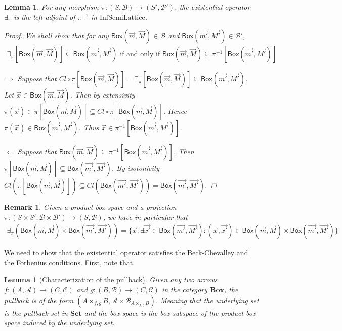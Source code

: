 \documentclass[12pt]{article}
\newtheorem{lemma}[theorem]{Lemma}
\newtheorem{remark}[theorem]{Remark}
\newcommand{\InfSemiLattice}{\text{InfSemiLattice}}
\newcommand{\bobject}{\mathsf{Box}}
\begin{document}
\begin{lemma}
    For any morphism $\pi:(S,\mathcal{B})\to(S',\mathcal{B}')$,
    the existential operator $\exists_\pi$ is the left adjoint of $\pi^{-1}$ in $\InfSemiLattice$.
    \begin{proof}
        We shall show that for any $\bobject(\vec{m},\vec{M})\in\mathcal{B}$ and $\bobject(\vec{m'},\vec{M'})\in\mathcal{B}'$,
        \begin{gather*}
            \exists_\pi[\bobject(\vec{m},\vec{M})]\subseteq \bobject(\vec{m'},\vec{M'})\text{ if and only if }
            \bobject(\vec{m},\vec{M})\subseteq \pi^{-1}[\bobject(\vec{m'},\vec{M'})]
        \end{gather*}
        \par $\Rightarrow$ Suppose that $Cl\circ \pi[\bobject(\vec{m},\vec{M})]=\exists_\pi[\bobject(\vec{m},\vec{M})]\subseteq \bobject(\vec{m'},\vec{M'})$.
        Let $\vec{x}\in\bobject(\vec{m},\vec{M})$.
        Then by extensivity $\pi(\vec{x})\in\pi[\bobject(\vec{m},\vec{M})]\subseteq Cl\circ \pi[\bobject(\vec{m},\vec{M})]$.
        Hence $\pi(\vec{x})\in\bobject(\vec{m'},\vec{M'})$. Thus $\vec{x}\in\pi^{-1}[\bobject(\vec{m'},\vec{M'})]$.
        \par $\Leftarrow$ Suppose that $\bobject(\vec{m},\vec{M})\subseteq \pi^{-1}[\bobject(\vec{m'},\vec{M'})]$.
        Then $\pi[\bobject(\vec{m},\vec{M})]\subseteq\bobject(\vec{m'},\vec{M'})$.
        By isotonicity $Cl(\pi[\bobject(\vec{m},\vec{M})])\subseteq Cl(\bobject(\vec{m'},\vec{M'}))=\bobject(\vec{m'},\vec{M'})$.
    \end{proof}
\end{lemma}
\begin{remark}
    Given a product box space and a projection $\pi:(S\times S',\mathcal{B}\times\mathcal{B}')\to(S,\mathcal{B})$,
    we have in particular that
    \begin{gather*}
        \exists_\pi(\bobject(\vec{m},\vec{M})\times\bobject(\vec{m'},\vec{M'}))=
        \{\vec{x}:\exists \vec{x'}\in \bobject(\vec{m'},\vec{M'}):(\vec{x},\vec{x'})
        \in \bobject(\vec{m},\vec{M})\times\bobject(\vec{m'},\vec{M'})
        \}
    \end{gather*}
\end{remark}
We need to show
that the existential operator satisfies the Beck-Chevalley
and the Forbenius conditions.
First, note that
\begin{lemma}[Characterization of the pullback]\label{lem:box-pullback}
    Given any two arrows $f:(A,\mathcal{A})\to(C,\mathcal{C})$
    and $g:(B,\mathcal{B})\to(C,\mathcal{C})$ in the category $\mathbf{Box}$,
    the pullback is of the form
    $(A\times_{f,g} B,\mathcal{A\times B}_{A\times_{f,g} B})$. Meaning that 
    the underlying set is the pullback set in $\mathbf{Set}$
    and the box space is the box subspace of the product box space induced
    by the underlying set.
\end{lemma}
\end{document}
